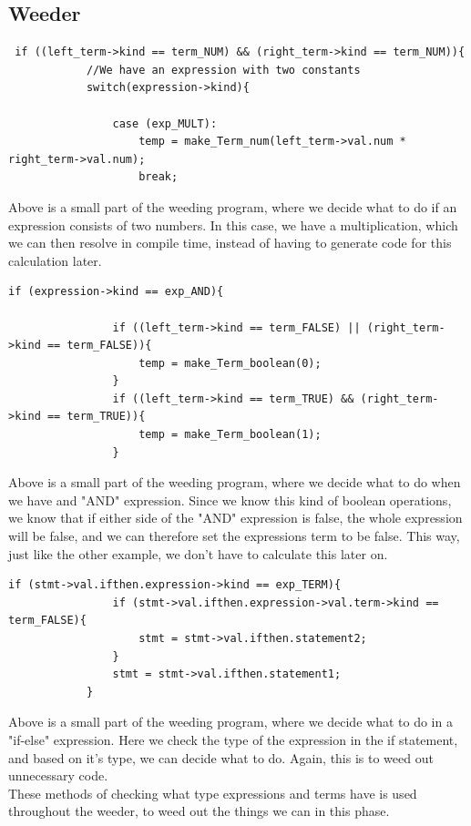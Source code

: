 \documentclass[a4paper,10pt,titlepage]{report}
\begin{document}
\subsection{Weeder}
\begin{lstlisting}
 if ((left_term->kind == term_NUM) && (right_term->kind == term_NUM)){
            //We have an expression with two constants
            switch(expression->kind){

                case (exp_MULT):
                    temp = make_Term_num(left_term->val.num * right_term->val.num);
                    break;
\end{lstlisting}
Above is a small part of the weeding program, where we decide what to do if an expression consists of two numbers. In this case, we have a multiplication, which we can then resolve in compile time, instead of having to generate code for this calculation later.
\begin{lstlisting}
if (expression->kind == exp_AND){

                if ((left_term->kind == term_FALSE) || (right_term->kind == term_FALSE)){
                    temp = make_Term_boolean(0);
                }
                if ((left_term->kind == term_TRUE) && (right_term->kind == term_TRUE)){
                    temp = make_Term_boolean(1);
                }
\end{lstlisting}
Above is a small part of the weeding program, where we decide what to do when we have and "AND" expression. Since we know this kind of boolean operations, we know that if either side of the "AND" expression is false, the whole expression will be false, and we can therefore set the expressions term to be false. This way, just like the other example, we don't have to calculate this later on.
\begin{lstlisting}
if (stmt->val.ifthen.expression->kind == exp_TERM){
                if (stmt->val.ifthen.expression->val.term->kind == term_FALSE){
                    stmt = stmt->val.ifthen.statement2;
                }
                stmt = stmt->val.ifthen.statement1;
            }
\end{lstlisting}
Above is a small part of the weeding program, where we decide what to do in a "if-else" expression. Here we check the type of the expression in the if statement, and based on it's type, we can decide what to do. Again, this is to weed out unnecessary code.\\
These methods of checking what type expressions and terms have is used throughout the weeder, to weed out the things we can in this phase.\\
\end{document}
